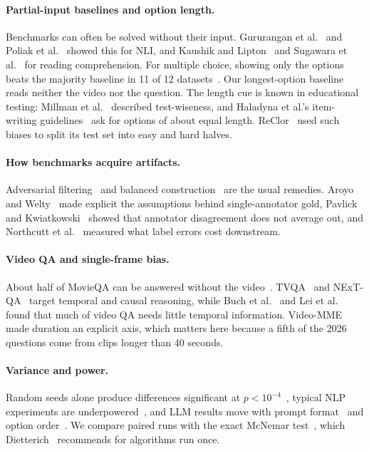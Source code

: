 \documentclass[sigconf,nonacm]{acmart}
\begin{document}
\paragraph{Partial-input baselines and option length.}
Benchmarks can often be solved without their input. Gururangan et
al.~\cite{gururangan2018artifacts} and Poliak et
al.~\cite{poliak2018hypothesisonly} showed this for NLI, and Kaushik and
Lipton~\cite{kaushik2018howmuch} and Sugawara et al.~\cite{sugawara2018easier}
for reading comprehension. For multiple choice, showing only the options beats
the majority baseline in 11 of 12 datasets~\cite{balepur2024artifacts}. Our
longest-option baseline reads neither the video nor the question. The length cue
is known in educational testing: Millman et al.~\cite{millman1965testwiseness}
described test-wiseness, and Haladyna et al.'s item-writing
guidelines~\cite{haladyna2002guidelines} ask for options of about equal length.
ReClor~\cite{yu2020reclor} used such biases to split its test set into easy and
hard halves.

\paragraph{How benchmarks acquire artifacts.}
Adversarial filtering~\cite{zellers2018swag, lebras2020aflite} and balanced
construction~\cite{goyal2017vqav2} are the usual remedies. Aroyo and
Welty~\cite{aroyo2015truth} made explicit the assumptions behind single-annotator
gold, Pavlick and Kwiatkowski~\cite{pavlick2019disagreements} showed that
annotator disagreement does not average out, and Northcutt et
al.~\cite{northcutt2021labelerrors} measured what label errors cost downstream.

\paragraph{Video QA and single-frame bias.}
About half of MovieQA can be answered without the video~\cite{jasani2019movieqa}.
TVQA~\cite{lei2018tvqa} and NExT-QA~\cite{xiao2021nextqa} target temporal and
causal reasoning, while Buch et al.~\cite{buch2022revisiting} and Lei et
al.~\cite{lei2023singleframe} found that much of video QA needs little temporal
information. Video-MME~\cite{fu2025videomme} made duration an explicit axis,
which matters here because a fifth of the 2026 questions come from clips longer
than 40 seconds.

\paragraph{Variance and power.}
Random seeds alone produce differences significant at
$p<10^{-4}$~\cite{reimers2017distributions}, typical NLP experiments are
underpowered~\cite{card2020littlepower}, and LLM results move with prompt
format~\cite{sclar2024formatting} and option order~\cite{zheng2024notrobust}. We
compare paired runs with the exact McNemar test~\cite{mcnemar1947}, which
Dietterich~\cite{dietterich1998approximate} recommends for algorithms run once.
\end{document}
